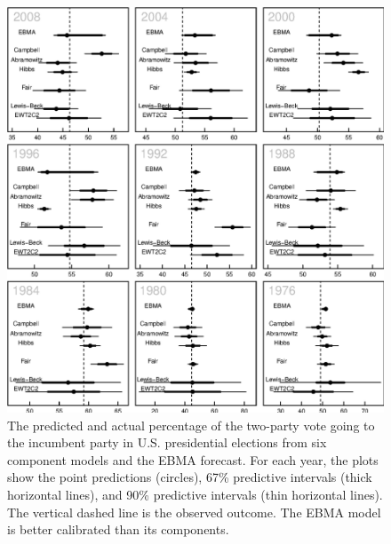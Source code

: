 \documentclass[12pt,fullpage,endnotes]{article}
\begin{document}
 \begin{figure}[p]
   \caption{\footnotesize The predicted and actual percentage of the
     two-party vote going to the incumbent party in U.S. presidential
     elections from six component models and the EBMA forecast.  For
     each year, the plots show the point predictions (circles), 67\%
     predictive intervals (thick horizontal lines), and 90\%
     predictive intervals (thin horizontal lines).  The vertical
     dashed line is the observed outcome.  The EBMA model is
   better calibrated than its components. }
 \label{PresPlots2}
 \begin{center}
 \includegraphics[width=5.6 in]{PresPlot}
 \end{center}
 \end{figure}
\end{document}
